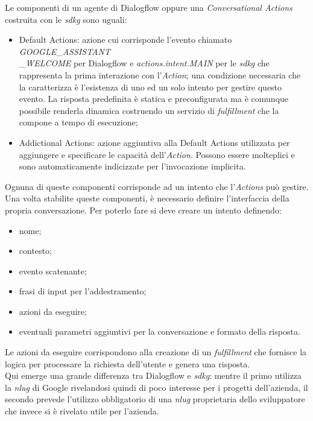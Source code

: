 		Le componenti di un agente di Dialogflow oppure una \emph{Conversational Actions} costruita con le \emph{\gls{sdkg}} sono uguali:
		\begin{itemize}
			\item Default Actions: azione cui corrisponde l'evento chiamato \textit{GOOGLE}\_\textit{ASSISTANT}\\ \_\textit{WELCOME} per Dialogflow e \textit{actions.intent.MAIN} per le \emph{\gls{sdkg}} che rappresenta la prima interazione con l'\emph{Action}; una condizione necessaria che la caratterizza è l'esistenza di uno ed un solo intento per gestire questo evento. La risposta predefinita è statica e preconfigurata ma è comunque possibile renderla dinamica costruendo un servizio di \emph{fulfillment} che la compone a tempo di esecuzione;
			\item Addictional Actions: azione aggiuntiva alla Default Actions utilizzata per aggiungere e specificare le capacità dell'\emph{Action}. Possono essere molteplici e sono automaticamente indicizzate per l'invocazione implicita.
		\end{itemize}
		Ognuna di queste componenti corrisponde ad un intento che l'\emph{Actions} può gestire. \\
		Una volta stabilite queste componenti, è necessario definire l'interfaccia della propria conversazione. Per poterlo fare si deve creare un intento definendo:
		\begin{itemize}
			\item nome;
			\item contesto;
			\item evento scatenante;
			\item frasi di input per l'addestramento;
			\item azioni da eseguire;
			\item eventuali parametri aggiuntivi per la conversazione e formato della risposta.
		\end{itemize}
		Le azioni da eseguire corrispondono alla creazione di un \emph{fulfillment} che fornisce la logica per processare la richiesta dell'utente e genera una risposta. \\
		Qui emerge una grande differenza tra Dialogflow e \emph{\gls{sdkg}}: mentre il primo utilizza la \emph{\gls{nlug}} di Google rivelandosi quindi di poco interesse per i progetti dell'azienda, il secondo prevede l'utilizzo obbligatorio di una \emph{\gls{nlug}} proprietaria dello sviluppatore che invece si è rivelato utile per l'azienda.
